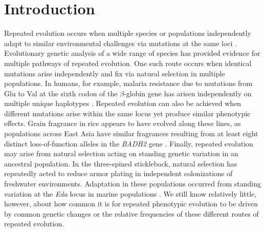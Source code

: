 \section*{Introduction}
\noindent Repeated evolution occurs when multiple species or populations independently adapt to similar environmental challenges via mutations at the same loci \cite[]{Wood_2005_15881688,Arendt_2008_18022278,Elmer_2011_21459472}.
Evolutionary genetic analysis of a wide range of species has provided evidence for multiple pathways of repeated evolution. 
One such route occurs when identical mutations arise independently and fix via natural selection in multiple populations. In humans, for example, malaria resistance due to mutations from Glu to Val at the sixth codon of the $\beta$-globin gene has arisen independently on multiple unique haplotypes  \cite[]{Currat_2002_11741197,Kwiatkowski_2005_16001361}.  
Repeated evolution can also be achieved when different mutations arise within the same locus yet produce similar phenotypic effects.  
Grain fragrance in rice appears to have evolved along these lines, as populations across East Asia have similar fragrances resulting from at least eight distinct loss-of-function alleles in the  \emph{BADH2} gene \cite[]{Kovach_2009_19706531}.  
Finally, repeated evolution may arise from natural selection acting on standing genetic variation in an ancestral population.  
In the three-spined stickleback, natural selection has repeatedly acted to reduce armor plating in independent colonizations of freshwater environments.  
Adaptation in these populations occurred from standing variation at the \emph{Eda} locus in marine populations \cite[]{Colosimo_2005_15790847}.  
We still know relatively little, however, about how common it is for repeated phenotypic evolution to be driven by common genetic changes or the relative frequencies of these different routes of repeated evolution.

